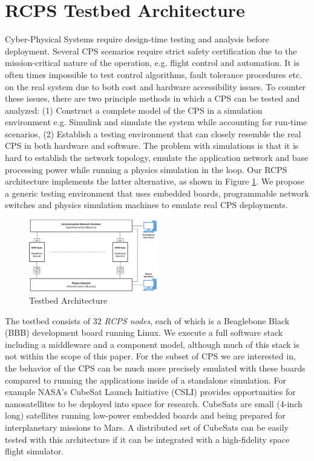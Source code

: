\section{RCPS Testbed Architecture}
\label{sec:Architecture}

Cyber-Physical Systems require design-time testing and analysis before deployment. Several CPS scenarios require strict safety certification due to the mission-critical nature of the operation, e.g. flight control and automation. It is often times impossible to test control algorithms, fault tolerance procedures etc. on the real system due to both cost and hardware accessibility issues. To counter these issues, there are two principle methods in which a CPS can be tested and analyzed: (1) Construct a complete model of the CPS in a simulation environment e.g. Simulink \cite{Simulink} and simulate the system while accounting for run-time scenarios, (2) Establish a testing environment that can closely resemble the real CPS in both hardware and software. The problem with simulations is that it is hard to establish the network topology, emulate the application network and base processing power while running a physics simulation  in the loop. Our RCPS architecture implements the latter alternative, as shown in Figure \ref{fig:architecture}. We propose a generic testing environment that uses embedded boards, programmable network switches and physics simulation machines to emulate real CPS deployments.

\begin{figure}[h]
	\centering
	\includegraphics[width=0.50\textwidth]{figs/architecture.png}
	\caption{Testbed Architecture}
	\label{fig:architecture}
\end{figure}

The testbed consists of 32 \emph{RCPS nodes}, each of which is a Beaglebone Black (BBB) \cite{BBB} development board running Linux. We execute a full software stack including a middleware and a component model, although much of this stack is not within the scope of this paper. For the subset of CPS we are interested in, the behavior of the CPS can be much more precisely emulated with these boards compared to running the applications inside of a standalone simulation. For example NASA's CubeSat Launch Initiative (CSLI) \cite{CubeSat} provides opportunities for nanosatellites to be deployed into space for research. CubeSats are small (4-inch long) satellites running low-power embedded boards and being prepared for interplanetary missions \cite{CubeSat_Mars} to Mars. A distributed set of CubeSats can be easily tested with this architecture if it can be integrated with a high-fidelity space flight simulator.  

